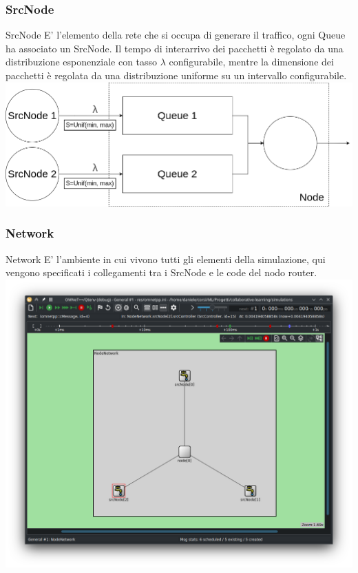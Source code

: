 \documentclass[compress]{beamer}
\begin{document}
\subsubsection*{SrcNode}
\begin{frame}{SrcNode}
    E' l'elemento della rete che si occupa di generare il traffico, ogni Queue ha associato un SrcNode.
    Il tempo di interarrivo dei pacchetti è regolato da una distribuzione esponenziale con tasso $\lambda$ configurabile, mentre la dimensione dei pacchetti è regolata da una distribuzione uniforme su un intervallo configurabile.
    \begin{adjustbox}{margin=0.5cm 0cm 0.5cm 0.5cm, center} %
        \includegraphics[width=.8\textwidth]{figs/src_scheme.png}
    \end{adjustbox}
\end{frame}

\subsubsection*{Network}
\begin{frame}{Network}
E' l'ambiente in cui vivono tutti gli elementi della simulazione, qui vengono specificati i collegamenti tra i SrcNode e le code del nodo router. 
    \begin{adjustbox}{margin=0cm 0cm 0cm 0cm, center} %
        \includegraphics[width=.65\textwidth]{figs/network_layout_3queues.png}
    \end{adjustbox}
\end{frame}
\end{document}
